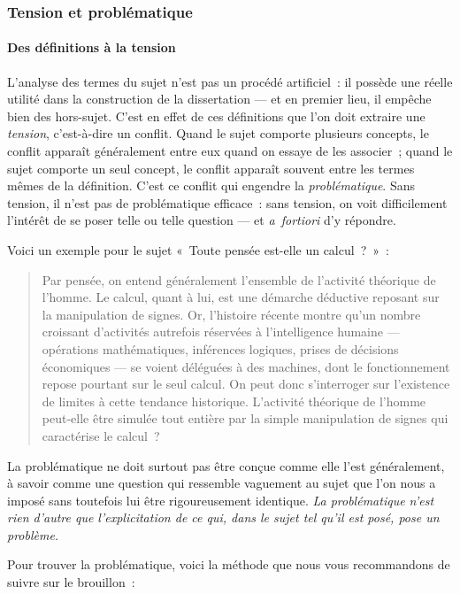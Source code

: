 \documentclass[a4paper]{article}
\begin{document}
\subsubsection{Tension et problématique}
\label{sec-2-2-2}
\paragraph{Des définitions à la tension}
\label{sec-2-2-2-1}


L'analyse des termes du sujet n'est pas un procédé artificiel : il
possède une réelle utilité dans la construction de la dissertation ---
et en premier lieu, il empêche bien des hors-sujet. C'est en effet de
ces définitions que l'on doit extraire une \emph{tension}, c'est-à-dire un
conflit. Quand le sujet comporte plusieurs concepts, le conflit apparaît
généralement entre eux quand on essaye de les associer ; quand le sujet
comporte un seul concept, le conflit apparaît souvent entre les termes
mêmes de la définition. C'est ce conflit qui engendre la
\emph{problématique}. Sans tension, il n'est pas de problématique efficace :
sans tension, on voit difficilement l'intérêt de se poser telle ou telle
question --- et \emph{a fortiori} d'y répondre.

Voici un exemple pour le sujet « Toute pensée est-elle un calcul ? » :

\begin{quote}
Par pensée, on entend généralement l'ensemble de l'activité théorique
de l'homme. Le calcul, quant à lui, est une démarche déductive
reposant sur la manipulation de signes. Or, l'histoire récente montre
qu'un nombre croissant d'activités autrefois réservées à
l'intelligence humaine --- opérations mathématiques, inférences
logiques, prises de décisions économiques --- se voient déléguées à
des machines, dont le fonctionnement repose pourtant sur le seul
calcul. On peut donc s'interroger sur l'existence de limites à cette
tendance historique. L'activité théorique de l'homme peut-elle être
simulée tout entière par la simple manipulation de signes qui
caractérise le calcul ?
\end{quote}

La problématique ne doit surtout pas être conçue comme elle l'est
généralement, à savoir comme une question qui ressemble vaguement au
sujet que l'on nous a imposé sans toutefois lui être rigoureusement
identique. \emph{La problématique n'est rien d'autre que l'explicitation de ce qui, dans le sujet tel qu'il est posé, pose un problème.} 

Pour trouver la problématique, voici la méthode que nous vous
recommandons de suivre sur le brouillon :
\end{document}

